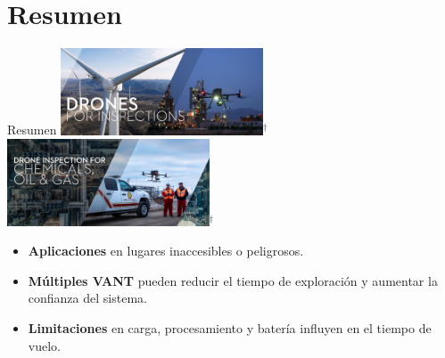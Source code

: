 \documentclass[
  24pt, %
  aspectratio=169, %
]{beamer}
\begin{document}
\section{Resumen}
\begin{frame}{Resumen}%
  \bigskip %
  \centering
  \includegraphics[width=0.45\textwidth,height=0.35\textheight]{DJI_B1}$^\dag$
  \hfil
  \includegraphics[width=0.45\textwidth,height=0.35\textheight]{DJI_B4}$^\dag$
  \vspace{2pt}\\
  
  \begin{itemize}
  \item \textbf{Aplicaciones} en lugares inaccesibles o peligrosos.
  \item \textbf{Múltiples VANT} pueden reducir el tiempo de exploración y aumentar la confianza del sistema.
  \item \textbf{Limitaciones} en carga, procesamiento y batería influyen en el tiempo de vuelo.
  \end{itemize}

\end{frame}
\end{document}
